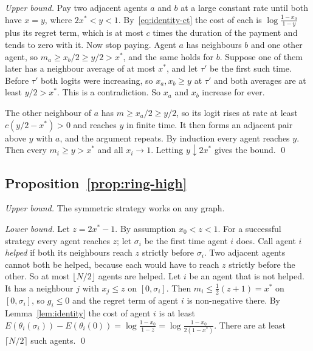 \documentclass[11pt,a4paper]{article}
\theoremstyle{definition}
\theoremstyle{plain}
\newcommand{\xs}{x^{*}}
\begin{document}
\emph{Upper bound.} Pay two adjacent agents $a$ and $b$ at a large constant rate until both have $x=y$, where $2\xs<y<1$. By~\eqref{eq:identity-ct} the cost of each is $\log\frac{1-x_0}{1-y}$ plus its regret term, which is at most $c$ times the duration of the payment and tends to zero with it. Now stop paying. Agent $a$ has neighbours $b$ and one other agent, so $m_a\ge x_b/2\ge y/2>\xs$, and the same holds for $b$. Suppose one of them later has a neighbour average of at most $\xs$, and let $\tau'$ be the first such time. Before $\tau'$ both logits were increasing, so $x_a,x_b\ge y$ at $\tau'$ and both averages are at least $y/2>\xs$. This is a contradiction. So $x_a$ and $x_b$ increase for ever.

The other neighbour of $a$ has $m\ge x_a/2\ge y/2$, so its logit rises at rate at least $c(y/2-\xs)>0$ and reaches $y$ in finite time. It then forms an adjacent pair above $y$ with $a$, and the argument repeats. By induction every agent reaches $y$. Then every $m_i\ge y>\xs$ and all $x_i\to1$. Letting $y\downarrow2\xs$ gives the bound. \qed

\subsection{Proposition~\ref{prop:ring-high}}
\emph{Upper bound.} The symmetric strategy works on any graph.

\emph{Lower bound.} Let $z=2\xs-1$. By assumption $x_0<z<1$. For a successful strategy every agent reaches $z$; let $\sigma_i$ be the first time agent $i$ does. Call agent $i$ \emph{helped} if both its neighbours reach $z$ strictly before $\sigma_i$. Two adjacent agents cannot both be helped, because each would have to reach $z$ strictly before the other. So at most $\lfloor N/2\rfloor$ agents are helped. Let $i$ be an agent that is not helped. It has a neighbour $j$ with $x_j\le z$ on $[0,\sigma_i]$. Then $m_i\le\frac12(z+1)=\xs$ on $[0,\sigma_i]$, so $g_i\le0$ and the regret term of agent $i$ is non-negative there. By Lemma~\ref{lem:identity} the cost of agent $i$ is at least $E(\theta_i(\sigma_i))-E(\theta_i(0))=\log\frac{1-x_0}{1-z}=\log\frac{1-x_0}{2(1-\xs)}$. There are at least $\lceil N/2\rceil$ such agents. \qed
\end{document}
